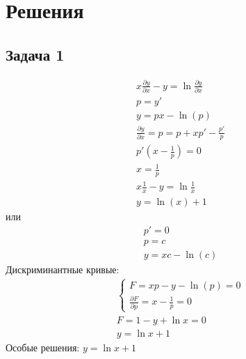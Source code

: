 
\newpage
\section*{Решения}
\subsection*{Задача 1}
	\begin{gather*}
		x \frac{\partial y}{\partial x} - y = \ln \frac{\partial y}{\partial x}\\
		p = y'\\
		y = px - \ln\left(p\right)\\
		\frac{\partial y}{\partial x} = p = p + xp'- \frac{p'}{p}\\
		p'\left(x - \frac{1}{p}\right) = 0\\
		x = \frac{1}{p}\\
		x \frac{1}{x} - y = \ln \frac{1}{x}\\
		y = \ln\left(x\right) + 1
	\end{gather*}
	или
	\begin{gather*}
		p'= 0\\
		p = c\\
		y = xc - \ln\left(c\right)
	\end{gather*}
	Дискриминантные кривые:
	\begin{gather*}
	\begin{cases}
		F = xp - y - \ln\left(p\right) = 0\\
		\frac{\partial F}{\partial p} = x - \frac{1}{p} = 0
	\end{cases}\\
	F = 1 - y + \ln x = 0\\
	y = \ln x + 1
	\end{gather*}
	Особые решения: $y = \ln x + 1$
	\begin{comment}
	\begin{tikzpicture}
		\begin{axis}[
		grid=both,
		minor tick num=4,
		grid style={line width=.1pt, draw=gray!10},
		major grid style={line width=.2pt,draw=gray!50},
		axis lines=middle,
		enlargelimits={abs=0.2},
		xlabel=$x$,
		ylabel={$\ln\left(x\right) + 1$}
		] 
		\addplot[domain=-1:5,samples=1000,smooth,blue]{ln\left(x\right) + 1};
		\end{axis}
	\end{tikzpicture}
	\end{comment}


\newpage
